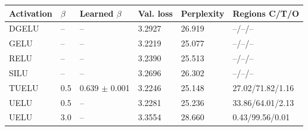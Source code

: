 \begin{tabular}{llllll}
\toprule
Activation & $\beta$ & Learned $\beta$ & Val. loss & Perplexity & Regions C/T/O \\
\midrule
DGELU & -- & -- & 3.2927 & 26.919 & --/--/-- \\
GELU & -- & -- & 3.2219 & 25.077 & --/--/-- \\
RELU & -- & -- & 3.2390 & 25.513 & --/--/-- \\
SILU & -- & -- & 3.2696 & 26.302 & --/--/-- \\
TUELU & 0.5 & 0.639 $\pm$ 0.001 & 3.2246 & 25.148 & 27.02/71.82/1.16 \\
UELU & 0.5 & -- & 3.2281 & 25.236 & 33.86/64.01/2.13 \\
UELU & 3.0 & -- & 3.3554 & 28.660 & 0.43/99.56/0.01 \\
\bottomrule
\end{tabular}
